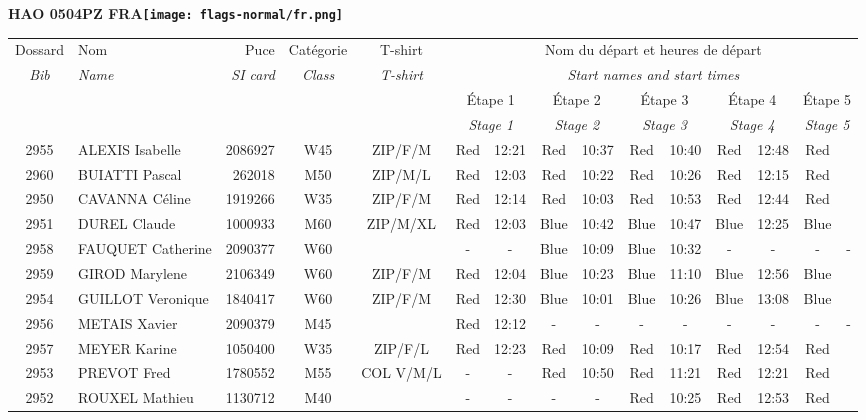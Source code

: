 \documentclass{report}
\begin{document}
\newpage
  \Huge \centering \bfseries HAO 0504PZ FRA\normalfont \footnotesize \sffamily \hfill \texttt{[image: flags-normal/fr.png]} \newline 
  \begin{longtable}{|c|l|r|c|c|*{5}{cc|}}
    Dossard & Nom  & Puce    & Catégorie & T-shirt & \multicolumn{10}{c|}{Nom du départ et heures de départ} \\
    \itshape Bib     & \itshape Name & \itshape SI card & \itshape Class  & \itshape  T-shirt  & \multicolumn{10}{c|}{\itshape Start names and start times} \\
    \hline
    & & & & & \multicolumn{2}{c|}{Étape 1} & \multicolumn{2}{c|}{Étape 2} & \multicolumn{2}{c|}{Étape 3} & \multicolumn{2}{c|}{Étape 4} & \multicolumn{2}{c|}{Étape 5} \\
    & & & & & \multicolumn{2}{c|}{\itshape Stage 1} & \multicolumn{2}{c|}{\itshape Stage 2} & \multicolumn{2}{c|}{\itshape Stage 3} & \multicolumn{2}{c|}{\itshape Stage 4} & \multicolumn{2}{c|}{\itshape Stage 5} \\
    \hline
    2955 & ALEXIS Isabelle & 2086927 & W45 & ZIP/F/M & Red & 12:21 & Red & 10:37 & Red & 10:40 & Red & 12:48 & Red &  \\
    2960 & BUIATTI Pascal & 262018 & M50 & ZIP/M/L & Red & 12:03 & Red & 10:22 & Red & 10:26 & Red & 12:15 & Red &  \\
    2950 & CAVANNA Céline & 1919266 & W35 & ZIP/F/M & Red & 12:14 & Red & 10:03 & Red & 10:53 & Red & 12:44 & Red &  \\
    2951 & DUREL Claude & 1000933 & M60 & ZIP/M/XL & Red & 12:03 & Blue & 10:42 & Blue & 10:47 & Blue & 12:25 & Blue &  \\
    2958 & FAUQUET Catherine & 2090377 & W60 &   & - &  - & Blue & 10:09 & Blue & 10:32 & - &  - & - &  -\\
    2959 & GIROD Marylene & 2106349 & W60 & ZIP/F/M & Red & 12:04 & Blue & 10:23 & Blue & 11:10 & Blue & 12:56 & Blue &  \\
    2954 & GUILLOT Veronique & 1840417 & W60 & ZIP/F/M & Red & 12:30 & Blue & 10:01 & Blue & 10:26 & Blue & 13:08 & Blue &  \\
    2956 & METAIS Xavier & 2090379 & M45 &   & Red & 12:12 & - &  - & - &  - & - &  - & - &  -\\
    2957 & MEYER Karine & 1050400 & W35 & ZIP/F/L & Red & 12:23 & Red & 10:09 & Red & 10:17 & Red & 12:54 & Red &  \\
    2953 & PREVOT Fred & 1780552 & M55 & COL V/M/L & - &  - & Red & 10:50 & Red & 11:21 & Red & 12:21 & Red &  \\
    2952 & ROUXEL Mathieu & 1130712 & M40 &   & - &  - & - &  - & Red & 10:25 & Red & 12:53 & Red &  \\
  \end{longtable}
\end{document}
